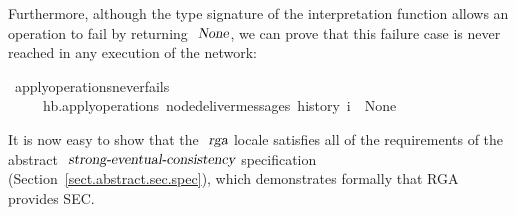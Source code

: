Furthermore, although the type signature of the interpretation function allows an operation to fail by returning $\isa{None}$, we can prove that this failure case is never reached in any execution of the network:
\begin{isabelle}
\ apply{\isacharunderscore}operations{\isacharunderscore}never{\isacharunderscore}fails{\isacharcolon}\\
~~~~\ {\isachardoublequoteopen}hb.apply{\isacharunderscore}operations\ {\isacharparenleft}node{\isacharunderscore}deliver{\isacharunderscore}messages\ {\isacharparenleft}history\ i{\isacharparenright}{\isacharparenright}\ {\isasymnoteq}\ None{\isachardoublequoteclose}
\end{isabelle}
It is now easy to show that the $\isa{rga}$ locale satisfies all of the requirements of the abstract $\isa{strong-eventual-consistency}$ specification (Section~\ref{sect.abstract.sec.spec}), which demonstrates formally that RGA provides SEC.
